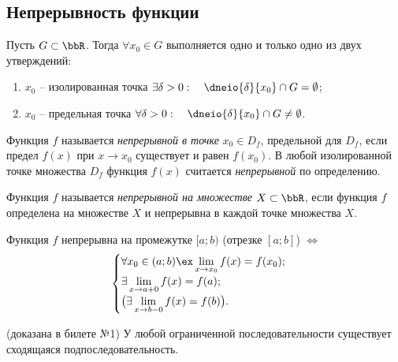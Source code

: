 \subsection{Непрерывность функции}
Пусть $G \subset \bbR$. Тогда $\forall x_0 \in G$ выполняется одно и только одно из двух утверждений:
\begin{enumerate}
\item $x_0$ -- изолированная точка $\exists \delta>0:\quad \dneio{\delta}{x_0} \cap G = \emptyset$;
\item $x_0$ -- предельная точка $\forall \delta > 0:\quad \dneio{\delta}{x_0}\cap G \neq \emptyset$.
\end{enumerate}

\begin{defn}
Функция $f$ называется \textit{непрерывной в точке} $x_0 \in D_f$, предельной для $D_f$, если предел $f(x)$ при $x \to x_0$ существует и равен $f(x_0)$. В любой изолированной точке множества $D_f$ функция $f(x)$ считается \textit{непрерывной} по определению. 
\end{defn}

\begin{defn}
Функция $f$ называется \textit{непрерывной на множестве} $X \subset \bbR$, если функция $f$ определена на множестве $X$ и непрерывна в каждой точке множества $X$. 
\end{defn}
\begin{lemm}
Функция $f$ непрерывна на промежутке $[a;b)$ (отрезке $[a;b]$) $\Longleftrightarrow$ 
$$
\begin{cases}
\forall x_0 \in (a;b) \ex \lim_{x \to x_0}\limits f(x) = f(x_0);\\
\exists \lim_{x \to a+0}\limits f(x) = f(a);\\
\bigr(\exists \lim_{x \to b-0}\limits f(x) = f(b)\bigl).\\
\end{cases}
$$  
\end{lemm}

\begin{thm}(доказана в билете №1)
У любой ограниченной последовательности существует сходящаяся подпоследовательность.
\end{thm}

